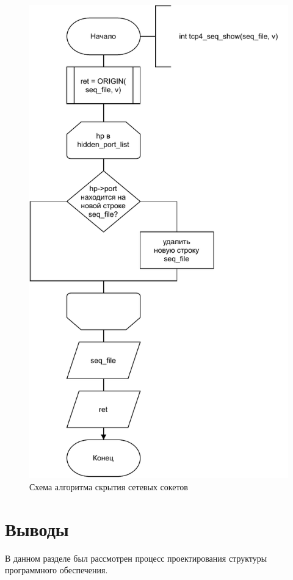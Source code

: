 \begin{figure}[H]
    \centering
    \includegraphics[scale=0.65]{pdf/oscw_net.pdf}
    \caption{Схема алгоритма скрытия сетевых сокетов}\label{img:net_hide_scheme}
\end{figure}

\section{Выводы}%
\label{sec:vyvody}

В данном разделе был рассмотрен процесс проектирования структуры программного обеспечения.
